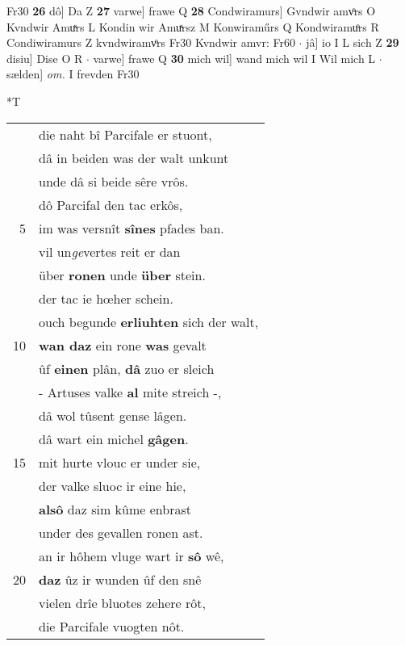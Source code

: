 \documentclass[8pt,a4paper,notitlepage]{article}
\begin{document}
\begin{table}[ht]
\begin{minipage}[t]{0.5\linewidth}
Fr30 \textbf{26} dô] Da Z \textbf{27} varwe] frawe Q \textbf{28} Condwiramurs] Gvndwir amvͦrs O Kvndwir Amuͯrs L Kondin wir Amuͯrsz M Konwiraműrs Q Kondwiramuͦrs R Condiwiramurs Z kvndwiramvͦrs Fr30 Kvndwir amvr: Fr60  $\cdot$ jâ] io I L sich Z \textbf{29} disiu] Dise O R  $\cdot$ varwe] frawe Q \textbf{30} mich wil] wand mich wil I Wil mich L  $\cdot$ sælden] \textit{om.} I frevden Fr30 \newline
\end{minipage}
\hspace{0.5cm}
\begin{minipage}[t]{0.5\linewidth}
\small
\begin{center}*T
\end{center}
\begin{tabular}{rl}
 & die naht bî Parcifale er stuont,\\ 
 & dâ in beiden was der walt unkunt\\ 
 & unde dâ si beide sêre vrôs.\\ 
 & dô Parcifal den tac erkôs,\\ 
5 & im was versnît \textbf{sînes} pfades ban.\\ 
 & vil un\textit{ge}vertes reit er dan\\ 
 & über \textbf{ronen} unde \textbf{über} stein.\\ 
 & der tac ie hœher schein.\\ 
 & ouch begunde \textbf{erliuhten} sich der walt,\\ 
10 & \textbf{wan daz} ein rone \textbf{was} gevalt\\ 
 & ûf \textbf{einen} plân, \textbf{dâ} zuo er sleich\\ 
 & - Artuses valke \textbf{al} mite streich -,\\ 
 & dâ wol tûsent gense lâgen.\\ 
 & dâ wart ein michel \textbf{gâgen}.\\ 
15 & mit hurte vlouc er under sie,\\ 
 & der valke sluoc ir eine hie,\\ 
 & \textbf{alsô} daz sim kûme enbrast\\ 
 & under des gevallen ronen ast.\\ 
 & an ir hôhem vluge wart ir \textbf{sô} wê,\\ 
20 & \textbf{daz} ûz ir wunden ûf den snê\\ 
 & vielen drîe bluotes zehere rôt,\\ 
 & die Parcifale vuogten nôt.\\ 

\end{tabular}
\end{minipage}
\end{table}
\end{document}
